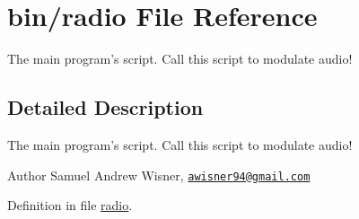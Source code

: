 \hypertarget{radio}{\section{bin/radio File Reference}
\label{radio}
}


The main program's script. Call this script to modulate audio!  




\subsection{Detailed Description}
The main program's script. Call this script to modulate audio! 

\begin{DoxyAuthor}{Author}
Samuel Andrew Wisner, \href{mailto:awisner94@gmail.com}{\tt awisner94@gmail.\+com} 
\end{DoxyAuthor}


Definition in file \hyperlink{radio_source}{radio}.

